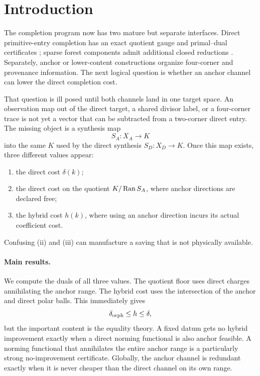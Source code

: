 \section{Introduction}

The completion program now has two mature but separate interfaces.
Direct primitive-entry completion has an exact quotient gauge and
primal--dual certificates \cite{WangTPC75,WangTPC77}; sparse forest
components admit additional closed reductions \cite{WangTPC78}.
Separately, anchor or lower-content constructions organize four-corner
and provenance information.  The next logical question is whether an
anchor channel can lower the direct completion cost.

That question is ill posed until both channels land in one target
space.  An observation map out of the direct target, a shared divisor
label, or a four-corner trace is not yet a vector that can be subtracted
from a two-corner direct entry.  The missing object is a synthesis map
\[
 S_A:X_A\longrightarrow K
\]
into the same \(K\) used by the direct synthesis
\(S_D:X_D\to K\).  Once this map exists, three different values appear:
\begin{enumerate}[label=(\roman*),leftmargin=2.4em]
\item the direct cost \(\delta(k)\);
\item the direct cost on the quotient \(K/\operatorname{Ran} S_A\), where anchor
directions are declared free;
\item the hybrid cost \(h(k)\), where using an anchor direction incurs
its actual coefficient cost.
\end{enumerate}
Confusing (ii) and (iii) can manufacture a saving that is not physically
available.

\paragraph{Main results.}
We compute the duals of all three values.  The quotient floor uses
direct charges annihilating the anchor range.  The hybrid cost uses the
intersection of the anchor and direct polar balls.  This immediately
gives
\[
 \delta_{\rm orph}\le h\le\delta,
\]
but the important content is the equality theory.  A fixed datum gets
no hybrid improvement exactly when a direct norming functional is also
anchor feasible.  A norming functional that annihilates the entire
anchor range is a particularly strong no-improvement certificate.
Globally, the anchor channel is redundant exactly when it is never
cheaper than the direct channel on its own range.

